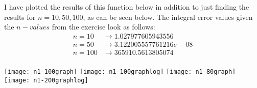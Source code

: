 I have plotted the results of this function below in addition to just finding the results for $n= 10,50,100$, as can be seen below. The integral error values given the $n-values$ from the exercise look as follows:
\begin{align*}
  n = 10 &\rightarrow 1.027977605943556 \\
  n = 50 &\rightarrow 3.122005557761216e-08 \\
  n = 100 &\rightarrow 365910.5613805074
\end{align*}
\\
\texttt{[image: n1-100graph]}
\texttt{[image: n1-100graphlog]}
\texttt{[image: n1-80graph]}
\texttt{[image: n1-200graphlog]}
